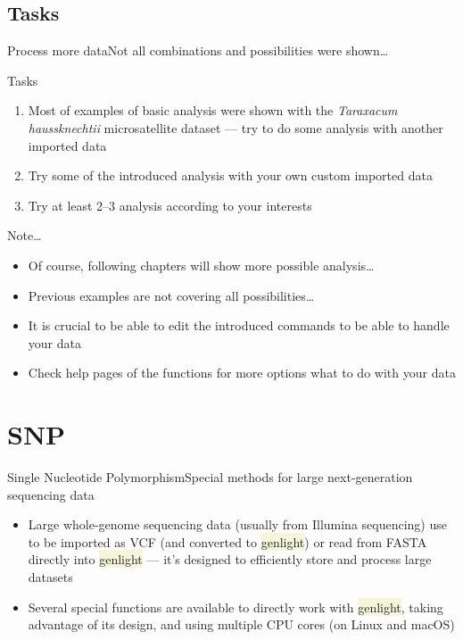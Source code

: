 \documentclass[compress, ucs, xelatex, 11pt, xcolor=svgnames, aspectratio=169,
	hyperref={
		bookmarks=true,
		unicode=true,
		colorlinks=true,
		pdftitle={Molecular data in R},
		plainpages=false,
		pdfauthor={Vojtech Zeisek},
		pdfsubject={Course about phylogeny and evolution in R},
		pdfcreator={XeLaTeX},
		pdfkeywords={R, evolution, phylogeny, molecular data},
		linkcolor=Crimson, %
		anchorcolor=Magenta, %
		citecolor=Magenta, %
		filecolor=Magenta, %
		menucolor=Magenta, %
		urlcolor=DodgerBlue, %
		pdftex},
	url={hyphens, lowtilde} %
	]{beamer}
\renewcommand{\texttt}[1]{\colorbox{Beige}{{\ttfamily #1}}}
\begin{document}
\subsection{Tasks}

\begin{frame}{Process more data}{Not all combinations and possibilities were shown\ldots}
	\begin{exampleblock}{Tasks}
		\begin{enumerate}
			\item Most of examples of basic analysis were shown with the \textit{Taraxacum haussknechtii} microsatellite dataset --- try to do some analysis with another imported data
			\item Try some of the introduced analysis with your own custom imported data
			\item Try at least 2--3 analysis according to your interests
		\end{enumerate}
	\end{exampleblock}
	\begin{block}{Note\ldots}
		\begin{itemize}
			\item Of course, following chapters will show more possible analysis\ldots
			\item Previous examples are not covering all possibilities\ldots
			\item It is crucial to be able to edit the introduced commands to be able to handle your data
			\item Check help pages of the functions for more options what to do with your data
		\end{itemize}
	\end{block}
\end{frame}

\section{SNP}

\begin{frame}{Single Nucleotide Polymorphism}{Special methods for large next-generation sequencing data}
	\tableofcontents[currentsection, sectionstyle=show/hide, hideothersubsections]
	\begin{itemize}
		\item Large whole-genome sequencing data (usually from Illumina sequencing) use to be imported as VCF (and converted to \texttt{genlight}) or read from FASTA directly into \texttt{genlight} --- it's designed to efficiently store and process large datasets
		\item Several special functions are available to directly work with \texttt{genlight}, taking advantage of its design, and using multiple CPU cores (on Linux and macOS)
	\end{itemize}
\end{frame}
\end{document}
